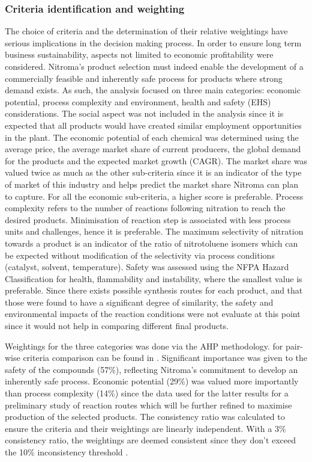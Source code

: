 \subsubsection{Criteria identification and weighting}

The choice of criteria and the determination of their relative weightings have serious implications in the decision making process. In order to ensure long term business sustainability, aspects not limited to economic profitability were considered. Nitroma's product selection must indeed enable the development of a commercially feasible and inherently safe process for products where strong demand exists. As such, the analysis focused on three main categories: economic potential, process complexity and environment, health and safety (EHS) considerations. The social aspect was not included in the analysis since it is expected that all products would have created similar employment opportunities in the plant. 
The economic potential of each chemical was determined using the average price, the average market share of current producers, the global demand for the products and the expected market growth (CAGR). The market share was valued twice as much as the other sub-criteria since it is an indicator of the type of market of this industry and helps predict the market share Nitroma can plan to capture. For all the economic sub-criteria, a higher score is preferable. Process complexity refers to the number of reactions following nitration to reach the desired products. Minimisation of reaction step is associated with less process units and challenges, hence it is preferable. The maximum selectivity of nitration towards a product is an indicator of the ratio of nitrotoluene isomers which can be expected without modification of the selectivity via process conditions (catalyst, solvent, temperature). Safety was assessed using the NFPA Hazard Classification for health, flammability and instability, where the smallest value is preferable. Since there exists possible synthesis routes for each product, and that those were found to have a significant degree of similarity, the safety and environmental impacts of the reaction conditions were not evaluate at this point since it would not help in comparing different final products. 

Weightings for the three categories was done via the AHP methodology.  for pair-wise criteria comparison can be found in . Significant importance was given to the safety of the compounds (57\%), reflecting Nitroma's commitment to develop an inherently safe process. Economic potential (29\%) was valued more importantly than process complexity (14\%) since the data used for the latter results for a preliminary study of reaction routes which will be further refined to maximise production of the selected products. The consistency ratio was calculated to ensure the criteria and their weightings are linearly independent. With a 3\% consistency ratio, the weightings are deemed consistent since they don't exceed the 10\% inconsistency threshold \cite{saaty_analytic_1987}.


